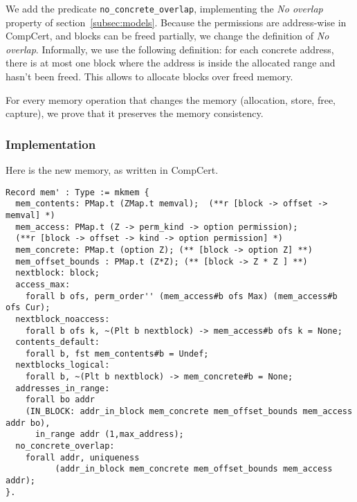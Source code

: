We add the predicate \texttt{no\_concrete\_overlap}, implementing the \textit{No overlap} property of section~\ref{subsec:models}. Because the permissions are address-wise in CompCert, and blocks can be freed partially, we change the definition of \textit{No overlap}. Informally, we use the following definition: for each concrete address, there is at most one block where the address is inside the allocated range and hasn't been freed. This allows to allocate blocks over freed memory.

For every memory operation that changes the memory (allocation, store, free, capture), we prove that it preserves the memory consistency.

\subsubsection{Implementation}
Here is the new memory, as written in CompCert.
{\footnotesize
\begin{lstlisting}
Record mem' : Type := mkmem {
  mem_contents: PMap.t (ZMap.t memval);  (**r [block -> offset -> memval] *)
  mem_access: PMap.t (Z -> perm_kind -> option permission);
  (**r [block -> offset -> kind -> option permission] *)
  mem_concrete: PMap.t (option Z); (** [block -> option Z] **)
  mem_offset_bounds : PMap.t (Z*Z); (** [block -> Z * Z ] **)
  nextblock: block;
  access_max:
    forall b ofs, perm_order'' (mem_access#b ofs Max) (mem_access#b ofs Cur);
  nextblock_noaccess:
    forall b ofs k, ~(Plt b nextblock) -> mem_access#b ofs k = None;
  contents_default:
    forall b, fst mem_contents#b = Undef;
  nextblocks_logical:
    forall b, ~(Plt b nextblock) -> mem_concrete#b = None;
  addresses_in_range:
    forall bo addr
    (IN_BLOCK: addr_in_block mem_concrete mem_offset_bounds mem_access addr bo),
      in_range addr (1,max_address);
  no_concrete_overlap:
    forall addr, uniqueness
          (addr_in_block mem_concrete mem_offset_bounds mem_access addr);
}.
\end{lstlisting}}
